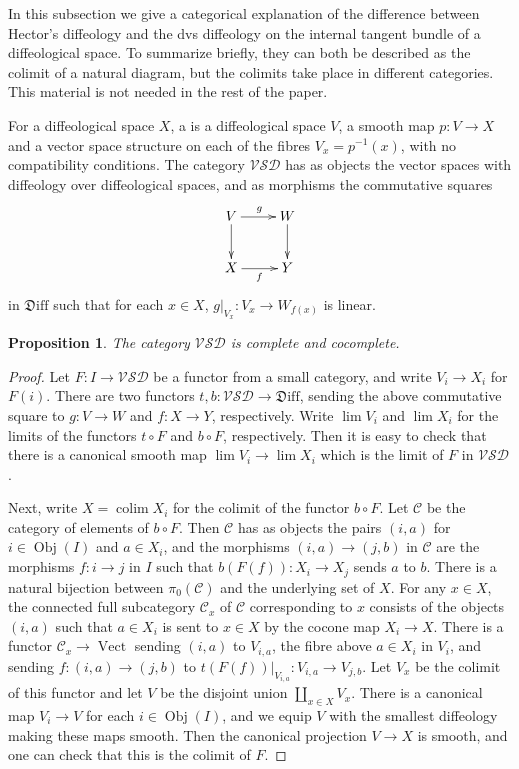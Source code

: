 \documentclass[12pt]{amsart}
\newcommand{\dfn}[1]{\textbf{\boldmath{#1}}}
\newtheorem{prop}[de]{Proposition}
\theoremstyle{remark}
\DeclareMathOperator*{\colim}{colim}
\newcommand{\ra}{\to}
\DeclareMathOperator{\obj}{Obj}
\DeclareMathOperator{\Vect}{Vect}
\newcommand{\Diff}{{\mathfrak{D}\mathrm{iff}}}
\newcommand{\cC}{{\mathcal{C}}}
\newcommand{\VSD}{{\mathcal{VSD}}}
\begin{document}
In this subsection we give a categorical explanation of the difference between Hector's diffeology
and the dvs diffeology on the internal tangent bundle of a diffeological space.
To summarize briefly, they can both be described as the colimit of a natural diagram,
but the colimits take place in different categories.
This material is not needed in the rest of the paper.

\medskip

For a diffeological space $X$,
a \dfn{vector space with diffeology over $X$}
is a diffeological space $V$, a smooth map $p:V \ra X$
and a vector space structure on each of the fibres $V_x = p^{-1}(x)$,
with no compatibility conditions.
The category $\VSD$ has as objects the vector spaces with diffeology
over diffeological spaces, and as morphisms the commutative squares
\[
\xymatrix{V \ar[r]^g \ar[d] & W \ar[d] \\ X \ar[r]_f & Y}
\]
in $\Diff$ such that
for each $x \in X$, $g|_{V_x}: V_x \ra W_{f(x)}$ is linear.

\begin{prop}
The category $\VSD$ is complete and cocomplete.
\end{prop}

\begin{proof}
Let $F: I \ra \VSD$ be a functor from a small category,
and write $V_i \ra X_i$ for $F(i)$.
There are two functors $t,b:\VSD \ra \Diff$,
sending the above commutative square to $g:V \ra W$ and $f:X \ra Y$, respectively.
Write $\lim V_i$ and $\lim X_i$ for the limits of the functors
$t \circ F$ and $b \circ F$, respectively.
Then it is easy to check that there is a canonical smooth map
$\lim V_i \ra \lim X_i$ which is the limit of $F$ in $\VSD$.

Next, write $X=\colim X_i$ for the colimit of the functor $b \circ F$.
Let $\cC$ be the category of elements of $b \circ F$.
Then $\cC$ has as objects the pairs $(i,a)$ for $i \in \obj(I)$ and $a \in X_i$,
and the morphisms $(i,a) \ra (j,b)$ in $\cC$ are the morphisms $f:i \ra j$ in $I$
such that $b(F(f)): X_i \ra X_j$ sends $a$ to $b$.
There is a natural bijection between $\pi_0(\cC)$ and the underlying set of $X$.
For any $x \in X$, the connected full subcategory $\cC_x$
of $\cC$ corresponding to $x$ consists of the objects $(i,a)$
such that $a \in X_i$ is sent to $x \in X$ by the cocone map $X_i \to X$.
There is a functor $\cC_x \ra \Vect$ sending $(i,a)$ to
$V_{i,a}$, the fibre above $a \in X_i$ in $V_i$, and
sending $f:(i,a) \ra (j,b)$ to $t(F(f))|_{V_{i,a}}:V_{i,a} \ra V_{j,b}$.
Let $V_x$ be the colimit of this functor
and let $V$ be the disjoint union $\coprod_{x \in X} V_x$.
There is a canonical map $V_i \ra V$ for each $i \in \obj(I)$,
and we equip $V$ with the smallest diffeology making these maps smooth.
Then the canonical projection $V \ra X$ is smooth,
and one can check that this is the colimit of $F$.
\end{proof}
\end{document}
